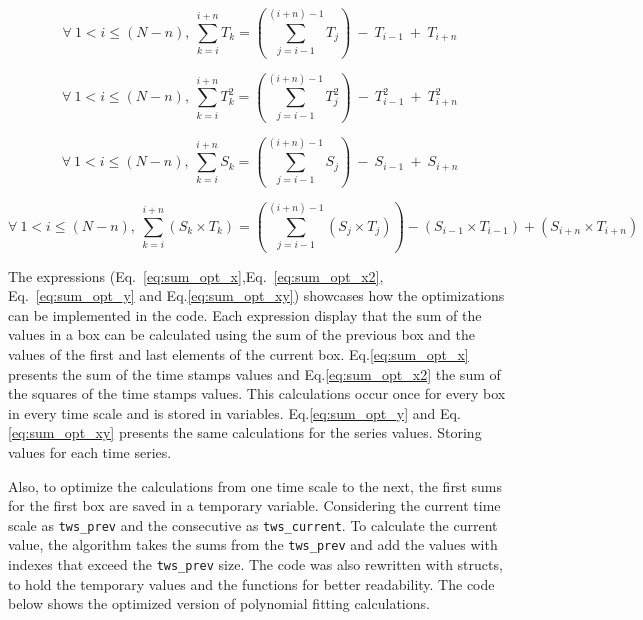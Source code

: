 \documentclass[article]{jss}
\begin{document}
\begin{equation}
  \label{eq:sum_opt_x}
  \forall~1<i\leq(N-n),~\sum_{k=i}^{i + n}T_k = \left(\sum_{j=i-1}^{(i+n)-1}T_j\right)~-~T_{i-1}~+~T_{i + n}
\end{equation}

\begin{equation}
  \label{eq:sum_opt_x2}
  \forall~1<i\leq(N-n),~\sum_{k=i}^{i + n}T_k^2 = \left(\sum_{j=i-1}^{(i+n)-1}T_j^2\right)~-~T_{i-1}^2~+~T_{i + n}^2
\end{equation}

\begin{equation}
  \label{eq:sum_opt_y}
  \forall~1<i\leq(N-n),~\sum_{k=i}^{i + n}S_k = \left(\sum_{j=i-1}^{(i+n)-1}S_j\right)~-~S_{i-1}~+~S_{i + n}
\end{equation}

\begin{equation}
  \label{eq:sum_opt_xy}
  \forall~1<i\leq(N-n),~\sum_{k=i}^{i + n} (S_k\times T_k) = \left(\sum_{j=i-1}^{(i+n)-1}(S_j \times T_j)\right)-(S_{i-1} \times T_{i-1})+(S_{i + n} \times T_{i + n})
\end{equation}

The expressions (Eq.~\ref{eq:sum_opt_x},Eq.~\ref{eq:sum_opt_x2}, Eq.~\ref{eq:sum_opt_y} and Eq.\ref{eq:sum_opt_xy}) showcases how the optimizations can be implemented in the code. Each expression display that the sum of the values in a box can be calculated using the sum of the previous box and the values of the first and last elements of the current box. Eq.\ref{eq:sum_opt_x} presents the sum of the time stamps values and Eq.\ref{eq:sum_opt_x2} the sum of the squares of the time stamps values. This calculations occur once for every box in every time scale and is stored in variables. Eq.\ref{eq:sum_opt_y} and Eq.\ref{eq:sum_opt_xy} presents the same calculations for the series values. Storing values for each time series.

Also, to optimize the calculations from one time scale to the next, the first sums for the first box are saved in a temporary variable. Considering the current time scale as \verb"tws_prev" and the consecutive as \verb"tws_current". To calculate the current value, the algorithm takes the sums from the \verb"tws_prev" and add the values with indexes that exceed the \verb"tws_prev" size. The code was also rewritten with structs, to hold the temporary values and the functions for better readability. The code below shows the optimized version of polynomial fitting calculations.
\end{document}
